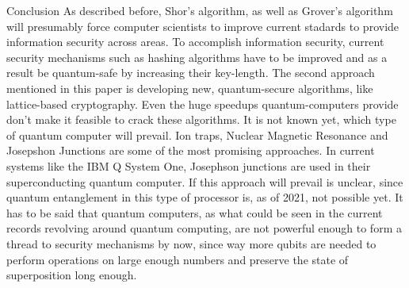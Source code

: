 \documentclass[aps,twocolumn,preprintnumbers]{revtex4}
\begin{document}
\begin{section}{Conclusion}
As described before, Shor's algorithm, 
as well as Grover's algorithm will presumably force computer scientists to improve current stadards to provide information security across areas. 
To accomplish information security, 
current security mechanisms such as hashing algorithms have to be improved and as a result be quantum-safe by increasing their key-length.
The second approach mentioned in this paper is developing new, 
quantum-secure algorithms, 
like lattice-based cryptography. 
Even the huge speedups quantum-computers provide don't make it feasible to crack these algorithms. 
It is not known yet, which type of quantum computer will prevail. 
Ion traps, Nuclear Magnetic Resonance and Josepshon Junctions are some of the most promising approaches. 
In current systems like the IBM Q System One, 
Josephson junctions are used in their superconducting quantum computer. 
If this approach will prevail is unclear, 
since quantum entanglement in this type of processor is, as of 2021, not possible yet. 
It has to be said that quantum computers, 
as what could be seen in the current records revolving around quantum computing, 
are not powerful enough to form a thread to security mechanisms by now, 
since way more qubits are needed to perform operations on large enough numbers and preserve the state of superposition long enough. 
\end{section}
\end{document}
